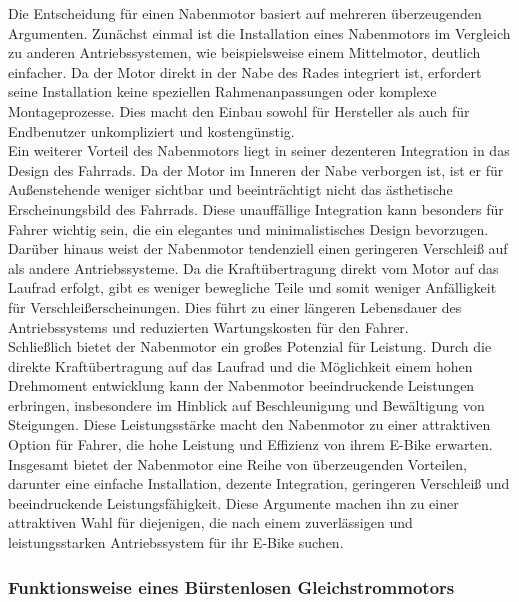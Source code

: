 Die Entscheidung für einen Nabenmotor basiert auf mehreren überzeugenden Argumenten.
Zunächst einmal ist die Installation eines Nabenmotors im Vergleich zu anderen Antriebssystemen, wie beispielsweise einem Mittelmotor, deutlich einfacher.
Da der Motor direkt in der Nabe des Rades integriert ist, erfordert seine Installation keine speziellen Rahmenanpassungen oder komplexe Montageprozesse.
Dies macht den Einbau sowohl für Hersteller als auch für Endbenutzer unkompliziert und kostengünstig.\\

Ein weiterer Vorteil des Nabenmotors liegt in seiner dezenteren Integration in das Design des Fahrrads.
Da der Motor im Inneren der Nabe verborgen ist, ist er für Außenstehende weniger sichtbar und beeinträchtigt nicht das ästhetische Erscheinungsbild des Fahrrads.
Diese unauffällige Integration kann besonders für Fahrer wichtig sein, die ein elegantes und minimalistisches Design bevorzugen.\\

Darüber hinaus weist der Nabenmotor tendenziell einen geringeren Verschleiß auf als andere Antriebssysteme.
Da die Kraftübertragung direkt vom Motor auf das Laufrad erfolgt, gibt es weniger bewegliche Teile und somit weniger Anfälligkeit für Verschleißerscheinungen.
Dies führt zu einer längeren Lebensdauer des Antriebssystems und reduzierten Wartungskosten für den Fahrer.\\

Schließlich bietet der Nabenmotor ein großes Potenzial für Leistung.
Durch die direkte Kraftübertragung auf das Laufrad und die Möglichkeit einem hohen Drehmoment entwicklung kann der Nabenmotor beeindruckende Leistungen erbringen, insbesondere im Hinblick auf Beschleunigung und Bewältigung von Steigungen.
Diese Leistungsstärke macht den Nabenmotor zu einer attraktiven Option für Fahrer, die hohe Leistung und Effizienz von ihrem E-Bike erwarten.\\

Insgesamt bietet der Nabenmotor eine Reihe von überzeugenden Vorteilen, darunter eine einfache Installation, dezente Integration, geringeren Verschleiß und beeindruckende Leistungsfähigkeit.
Diese Argumente machen ihn zu einer attraktiven Wahl für diejenigen, die nach einem zuverlässigen und leistungsstarken Antriebssystem für ihr E-Bike suchen.\\
\subsubsection*{Funktionsweise eines Bürstenlosen Gleichstrommotors}


